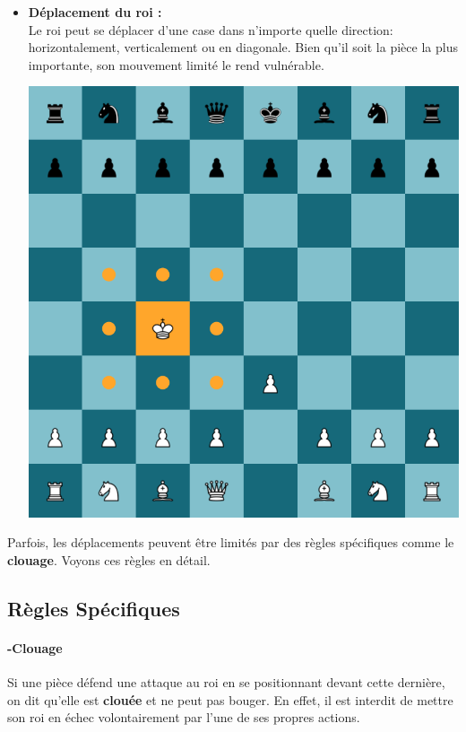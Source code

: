 \documentclass{article}
\begin{document}
\begin{itemize}
    \item \begin{minipage}{0.45\textwidth}
        \textbf{Déplacement du roi :} \\
        Le roi peut se déplacer d'une case dans n'importe quelle direction: horizontalement, verticalement ou en diagonale.
        Bien qu'il soit la pièce la plus importante, son mouvement limité le rend vulnérable.
    \end{minipage}
    \hspace{0.05\textwidth}
    \begin{minipage}{0.45\textwidth}
        \centering
        \includegraphics[width=\textwidth]{roiMove.png}
    \end{minipage}

\end{itemize}

\vspace{0.5cm}

Parfois, les déplacements peuvent être limités par des règles spécifiques comme le \textbf{clouage}. Voyons ces règles en détail.

\subsection{Règles Spécifiques}
\paragraph{-Clouage} Si une pièce défend une attaque au roi en se positionnant devant cette dernière, on dit qu'elle est \textbf{clouée}
 et ne peut pas bouger. En effet, il est interdit de mettre son roi en échec volontairement par l'une de ses propres actions.
\end{document}
